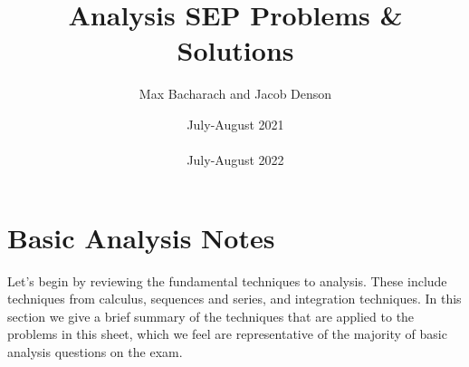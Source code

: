 \documentclass[answers]{exam}
\title{Analysis SEP Problems \& Solutions}
\date{July-August 2021\\\text{and}\\July-August 2022}
\author{Max Bacharach and Jacob Denson}
\theoremstyle{problemstyle}
\newcommand{\1}[1]{\textbf{1}_{\left[#1\right]}} %
\begin{document}
\maketitle

\tableofcontents

\newpage

\section{Basic Analysis Notes}

Let's begin by reviewing the fundamental techniques to analysis. These include techniques from calculus, sequences and series, and integration techniques. In this section we give a brief summary of the techniques that are applied to the problems in this sheet, which we feel are representative of the majority of basic analysis questions on the exam.
\end{document}
